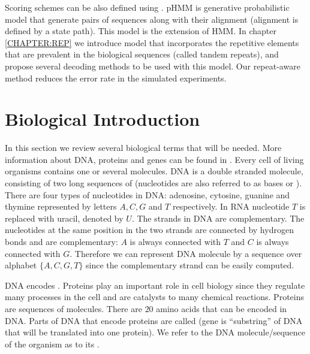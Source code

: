 Scoring schemes can be also defined using .  pHMM is generative probabilistic model that generate pairs of
sequences along with their alignment (alignment is defined by a state path).
This model is the extension of HMM. In chapter \ref{CHAPTER:REP} we introduce
model that incorporates the repetitive elements that are prevalent in the
biological sequences (called tandem repeats), and propose several decoding
methods to be used with this model. Our repeat-aware method reduces the error
rate in the simulated experiments. 

\section{Biological Introduction}\label{SECTION:BIOINTRO}


In this section we review several biological terms that will be needed. More
information about DNA, proteins and genes can be found in
\cite{BiologyForDummies, UnderstandingBioinformatics}.  Every cell of living
organisms contains one or several  molecules. DNA is a double
stranded molecule, consisting of two long sequences of 
(nucleotides are also referred to as bases or ). There are
four types of nucleotides in DNA: adenosine, cytosine, guanine and thymine
represented by letters $A,C,G$ and $T$ respectively. In RNA nucleotide $T$ is
replaced with uracil, denoted by $U$. The strands in DNA are complementary. The
nucleotides at the same position in the two strands are connected by hydrogen
bonds and are complementary: $A$ is always connected with $T$ and $C$ is always
connected with $G$. Therefore we can represent DNA molecule by a sequence over
alphabet $\{A,C,G,T\}$ since the complementary strand can be easily computed.

DNA encodes . Proteins play an important role in cell
biology since  they regulate many processes in the cell and are catalysts to
many chemical reactions. Proteins are sequences of 
molecules. There are $20$ amino acids that can be encoded in DNA. Parts of DNA
that encode proteins are called  (gene is ``substring'' of
DNA that will be translated into one protein). We refer to the DNA molecule/sequence of
the organism as to its .

